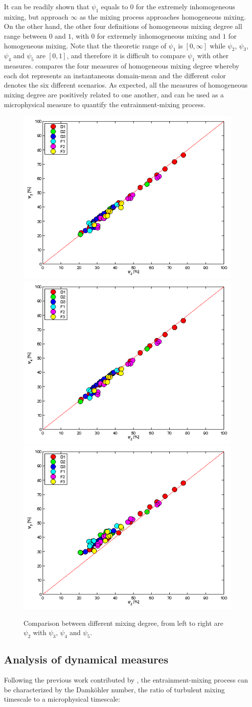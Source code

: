 \documentclass[draft,jgrga]{AGUTeX}
\begin{document}
\begin{article}
It can be readily shown that $\psi_1$ equals to $0$ for the extremely inhomogeneous mixing, but 
approach $\infty$ as the mixing process approaches homogeneous mixing. On the other hand, the 
other four definitions of homogeneous mixing degree all range between $0$ and $1$, with $0$ for 
extremely inhomogeneous mixing and $1$ for homogeneous mixing. 
Note that the theoretic range of $\psi_1$ is $[0, \infty]$ while $\psi_2$, $\psi_3$, $\psi_4$ and $\psi_5$ 
are $[0, 1]$, and therefore it is difficult to compare $\psi_1$ with other measures.
 compares the four measures of homogeneous mixing degree whereby each dot represents an 
instantaneous domain-mean and the different color denotes the six different scenarios.
As expected, all the measures of homogeneous mixing degree are positively related 
to one another, and can be used as a microphysical measure to quantify the entrainment-mixing process.
\begin{figure}[!htbp]\centering
\includegraphics[width=0.3\linewidth]{Figures/phi2_phi3}
\includegraphics[width=0.3\linewidth]{Figures/phi2_phi4}
\includegraphics[width=0.3\linewidth]{Figures/phi2_phi5}
\caption{Comparison between different mixing degree, from left to right are $\psi_2$ with $\psi_3$, $\psi_4$ and $\psi_5$.\label{phi_compare}}
\end{figure}

\subsection{Analysis of dynamical measures}
Following the previous work contributed by 
\cite{Krueger1997Modeling,Grabowski1993Cumulus, Burnet2007Observational}, 
the entrainment-mixing process can be characterized by the Damk{\"o}hler number, the ratio of 
turbulent mixing timescale to a microphysical timescale:


\end{article}
\end{document}
